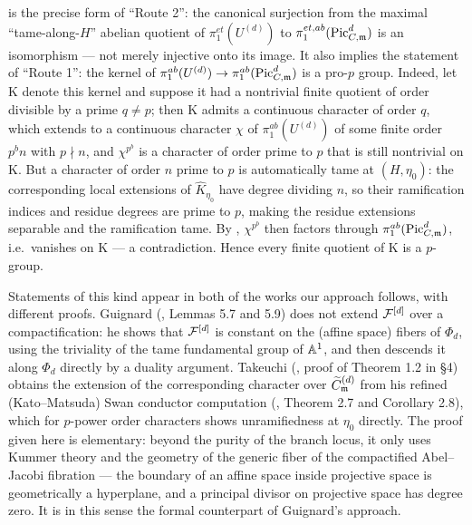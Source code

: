 \begin{rem*}
     is the precise form of ``Route 2'': the canonical
    surjection from the maximal ``tame-along-$H$'' abelian quotient of
    $\pi_1^{et}(U^{(d)})$ to $\pi_1^{et, ab}(\PicCm[d])$ is an isomorphism --- not merely
    injective onto its image. It also implies the statement of ``Route 1'': the kernel of
    $\pi_1^{ab}(U^{(d)}) \to \pi_1^{ab}(\PicCm[d])$ is a pro-$p$ group. Indeed, let
    $\mathrm{K}$ denote this kernel and suppose it had a nontrivial finite quotient of order
    divisible by a prime $q \neq p$; then $\mathrm{K}$ admits a continuous character of order
    $q$, which extends to a continuous character $\chi$ of $\pi_1^{ab}(U^{(d)})$ of some
    finite order $p^b n$ with $p \nmid n$, and $\chi^{p^b}$ is a character of order prime to
    $p$ that is still nontrivial on $\mathrm{K}$. But a character of order $n$ prime to $p$
    is automatically tame at $(H, \eta_0)$: the corresponding local extensions of
    $\widehat{K}_{\eta_0}$ have degree dividing $n$, so their ramification indices and residue
    degrees are prime to $p$, making the residue extensions separable and the ramification
    tame. By , $\chi^{p^b}$ then factors through
    $\pi_1^{ab}(\PicCm[d])$, i.e.\ vanishes on $\mathrm{K}$ --- a contradiction. Hence every
    finite quotient of $\mathrm{K}$ is a $p$-group.
\end{rem*}

\begin{rem*}
    Statements of this kind appear in both of the works our approach follows, with different
    proofs. Guignard (\cite{Guignard2018}, Lemmas 5.7 and 5.9) does not extend $\cF^{[d]}$
    over a compactification: he shows that $\cF^{[d]}$ is constant on the (affine space)
    fibers of $\Phi_d$, using the triviality of the tame fundamental group of $\A^1$, and then
    descends it along $\Phi_d$ directly by a duality argument. Takeuchi
    (\cite{takeuchi2018blow}, proof of Theorem 1.2 in \S 4) obtains the extension of the
    corresponding character over $\Cmod{d}$ from his refined (Kato--Matsuda) Swan conductor
    computation (\cite{takeuchi2018blow}, Theorem 2.7 and Corollary 2.8), which for $p$-power
    order characters shows unramifiedness at $\eta_0$ directly. The proof given here is
    elementary: beyond the purity of the branch locus, it only uses Kummer theory and the
    geometry of the generic fiber of the compactified Abel--Jacobi fibration --- the boundary
    of an affine space inside projective space is geometrically a hyperplane, and a principal
    divisor on projective space has degree zero. It is in this sense the formal counterpart of
    Guignard's approach.
\end{rem*}
